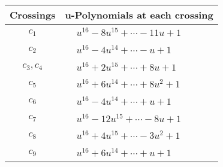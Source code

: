 \documentclass[1p]{elsarticle_modified}
\theoremstyle{definition}
\begin{document}
\begin{tabular}{m{50pt}|m{274pt}}
Crossings & \hspace{64pt}u-Polynomials at each crossing \\
\hline $$\begin{aligned}c_{1}\end{aligned}$$&$\begin{aligned}
&u^{16}-8 u^{15}+\cdots-11 u+1
\end{aligned}$\\
\hline $$\begin{aligned}c_{2}\end{aligned}$$&$\begin{aligned}
&u^{16}-4 u^{14}+\cdots- u+1
\end{aligned}$\\
\hline $$\begin{aligned}c_{3},c_{4}\end{aligned}$$&$\begin{aligned}
&u^{16}+2 u^{15}+\cdots+8 u+1
\end{aligned}$\\
\hline $$\begin{aligned}c_{5}\end{aligned}$$&$\begin{aligned}
&u^{16}+6 u^{14}+\cdots+8 u^2+1
\end{aligned}$\\
\hline $$\begin{aligned}c_{6}\end{aligned}$$&$\begin{aligned}
&u^{16}-4 u^{14}+\cdots+u+1
\end{aligned}$\\
\hline $$\begin{aligned}c_{7}\end{aligned}$$&$\begin{aligned}
&u^{16}-12 u^{15}+\cdots-8 u+1
\end{aligned}$\\
\hline $$\begin{aligned}c_{8}\end{aligned}$$&$\begin{aligned}
&u^{16}+4 u^{15}+\cdots-3 u^2+1
\end{aligned}$\\
\hline $$\begin{aligned}c_{9}\end{aligned}$$&$\begin{aligned}
&u^{16}+6 u^{14}+\cdots+u+1
\end{aligned}$\\

\end{tabular}
\end{document}
